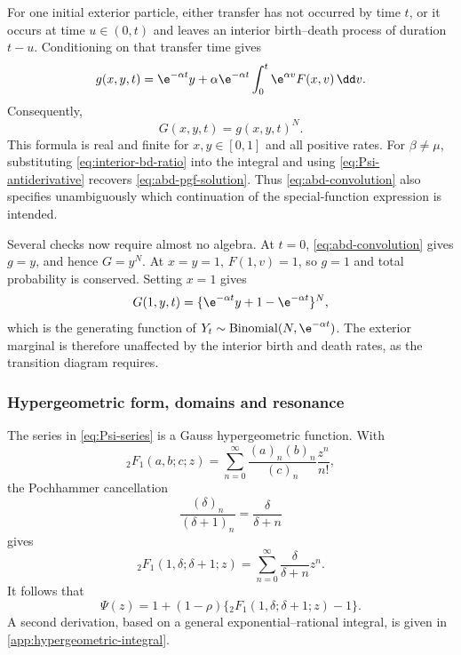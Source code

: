 For one initial exterior particle, either transfer has not occurred by time \(t\),
or it occurs at time \(u\in(0,t)\) and leaves an interior birth--death process of
duration \(t-u\).  Conditioning on that transfer time gives
\begin{equation}
  g(x,y,t)
  =\e^{-\alpha t}y
   +\alpha\e^{-\alpha t}
      \int_0^t \e^{\alpha v}F(x,v)\,\dd v.
  \label{eq:abd-convolution}
\end{equation}
Consequently,
\begin{equation}
  G(x,y,t)=g(x,y,t)^N.
  \label{eq:abd-convolution-power}
\end{equation}
This formula is real and finite for \(x,y\in[0,1]\) and all positive rates.  For
\(\beta\neq\mu\), substituting \cref{eq:interior-bd-ratio} into the integral and
using \cref{eq:Psi-antiderivative} recovers
\cref{eq:abd-pgf-solution}.  Thus \cref{eq:abd-convolution} also specifies
unambiguously which continuation of the special-function expression is intended.

Several checks now require almost no algebra.  At \(t=0\),
\cref{eq:abd-convolution} gives \(g=y\), and hence \(G=y^N\).  At
\(x=y=1\), \(F(1,v)=1\), so \(g=1\) and total probability is conserved.
Setting \(x=1\) gives
\begin{equation}
  G(1,y,t)
  =\{\e^{-\alpha t}y+1-\e^{-\alpha t}\}^{N},
  \label{eq:abd-exterior-binomial}
\end{equation}
which is the generating function of
\(Y_t\sim\operatorname{Binomial}(N,\e^{-\alpha t})\).  The exterior marginal is
therefore unaffected by the interior birth and death rates, as the transition
diagram requires.

\subsubsection{Hypergeometric form, domains and resonance}
\label{sec:abd-hypergeometric}

The series in \cref{eq:Psi-series} is a Gauss hypergeometric function.  With
\begin{equation}
  {}_2F_1(a,b;c;z)
  =\sum_{n=0}^{\infty}
    \frac{(a)_n(b)_n}{(c)_n}\frac{z^n}{n!},
  \label{eq:hypergeometric-definition}
\end{equation}
the Pochhammer cancellation
\begin{equation}
  \frac{(\delta)_n}{(\delta+1)_n}
  =\frac{\delta}{\delta+n}
  \label{eq:pochhammer-ratio}
\end{equation}
gives
\begin{equation}
  {}_2F_1(1,\delta;\delta+1;z)
  =\sum_{n=0}^{\infty}\frac{\delta}{\delta+n}z^n.
  \label{eq:hypergeometric-simple-series}
\end{equation}
It follows that
\begin{equation}
  \Psi(z)
  =1+(1-\rho)
   \{{}_2F_1(1,\delta;\delta+1;z)-1\}.
  \label{eq:Psi-hypergeometric}
\end{equation}
A second derivation, based on a general exponential--rational integral, is given in
\cref{app:hypergeometric-integral}.

